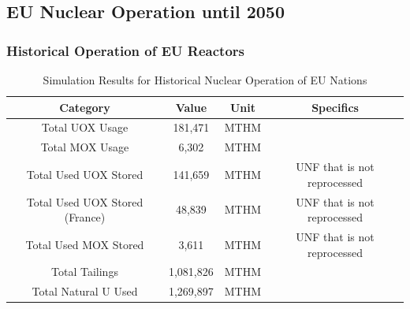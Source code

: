 \subsection{EU Nuclear Operation until 2050}

\begin{frame}
	\frametitle{Historical Operation of EU Reactors}
	
\begin{table}[h]
	\centering
		\begin{tabular}{cccc}
			\hline
			\textbf{Category } & \textbf{Value} & \textbf{Unit} & \textbf{Specifics}\\ \hline
			Total UOX Usage  & 181,471 & MTHM &  \\ 
			Total MOX Usage  & 6,302 & MTHM & \\ 
			Total Used UOX Stored  & 141,659 & MTHM & \gls{UNF} that is not reprocessed\\  
			Total Used UOX Stored (France) & 48,839 & MTHM & \gls{UNF} that is not reprocessed \\
			Total Used  MOX Stored  & 3,611 & MTHM & \gls{UNF} that is not reprocessed \\ 
			Total Tailings  & 1,081,826 & MTHM & \\ 
			Total Natural U Used  & 1,269,897 & MTHM & \\ \hline
		\end{tabular}
		\caption{Simulation Results for Historical Nuclear Operation of \gls{EU} Nations}
		\label{tab:sim_result}
\end {table}

\end{frame}

